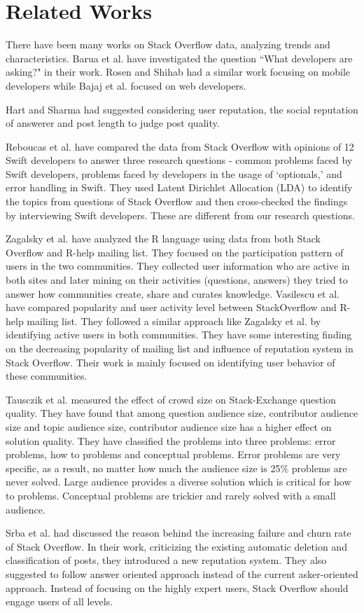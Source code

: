 \section{Related Works}
\label{sec:Related Works}
There have been many works on Stack Overflow data, analyzing trends and characteristics. Barua et al.\citep{Barua2012} have investigated the question ``What developers are asking?" in their work.
Rosen and Shihab\citep{Rosen2015} had a similar work focusing on mobile developers while Bajaj et al.\citep{Bajaj2014}  focused on web developers.

Hart and Sharma\citep{Hart2014} had suggested considering user reputation, the social reputation of answerer and post length to judge post quality.

Reboucas et al.\citep{Reboucas2016} have compared the data from Stack Overflow with opinions of 12 Swift developers to answer three research questions - common problems faced by Swift developers, problems faced by developers in the usage of `optionals,' and error handling in Swift. They used Latent Dirichlet Allocation (LDA) to identify the topics from questions of Stack Overflow and then cross-checked the findings by interviewing Swift developers. These are different from our research questions.

Zagalsky et al.\citep{Zagalsky2016} have analyzed the R language using data from both Stack Overflow and R-help mailing list. They focused on the participation pattern of users in the two communities. They collected user information who are active in both sites and later mining on their activities (questions, answers) they tried to answer how communities create, share and curates knowledge. Vasilescu et al.\citep{Vasilescu2014} have compared popularity and user activity level between StackOverflow and R-help mailing list. They followed a similar approach like Zagalsky et al.\citep{Zagalsky2016} by identifying active users in both communities. They have some interesting finding on the decreasing popularity of mailing list and influence of reputation system in Stack Overflow. Their work is mainly focused on identifying user behavior of these communities.

Tausczik et al.\citep{TausczikWC17} measured the effect of crowd size on Stack-Exchange question quality. They have found that among question audience size, contributor audience size and topic audience size, contributor audience size has a higher effect on solution quality. They have classified the problems into three problems: error problems, how to problems and conceptual problems. Error problems are very specific, as a result, no matter how much the audience size is 25\% problems are never solved. Large audience provides a diverse solution which is critical for how to problems. Conceptual problems are trickier and rarely solved with a small audience.

Srba et al.\citep{Srba2016} had discussed the reason behind the increasing failure and churn rate of Stack Overflow. In their work, criticizing the existing automatic deletion and classification of posts, they introduced a new reputation system. They also suggested to follow answer oriented approach instead of the current asker-oriented approach. Instead of focusing on the highly expert users, Stack Overflow should engage users of all levels.
